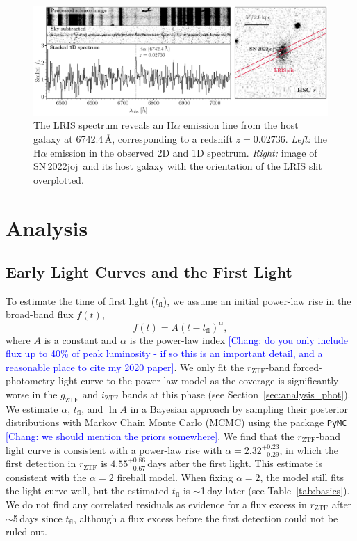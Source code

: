 \documentclass[twocolumn]{aastex631}
\newcommand{\sn}{SN\,2022joj}
\newcommand{\chang}[1]{\textcolor{blue}{[Chang: #1]}}
\begin{document}
\begin{CJK*}{UTF8}{gbsn}


\begin{figure}
    \centering
    \includegraphics[width=\linewidth]{host_spec.pdf}
    \caption{The LRIS spectrum reveals an H$\alpha$ emission line from the host galaxy at 6742.4\,\AA, corresponding to a redshift $z=0.02736$. \textit{Left:} the H$\alpha$ emission in the observed 2D and 1D spectrum. %
    \textit{Right:} image of \sn\ and its host galaxy with the orientation of the LRIS slit overplotted.    
    }
    \label{fig:host_spec}
\end{figure}

\section{Analysis} \label{sec:analysis}
\subsection{Early Light Curves and the First Light}
To estimate the time of first light ($t_\mathrm{fl}$), we assume an initial power-law rise in the broad-band flux $f(t)$,
$$
f(t) = A (t-t_\mathrm{fl})^\alpha,
$$
where $A$ is a constant and $\alpha$ is the power-law index \chang{do you only include flux up to 40\% of peak luminosity - if so this is an important detail, and a reasonable place to cite my 2020 paper}. We only fit the $r_\mathrm{ZTF}$-band forced-photometry light curve to the power-law model as the coverage is significantly worse in the $g_\mathrm{ZTF}$ and $i_\mathrm{ZTF}$ bands at this phase (see Section~\ref{sec:analysis_phot}). We estimate $\alpha$, $t_\mathrm{fl}$, and $\ln A$ in a Bayesian approach by sampling their posterior distributions with Markov Chain Monte Carlo (MCMC) using the package \texttt{PyMC} \citep{pymc_2016} \chang{we should mention the priors somewhere}. We find that the $r_\mathrm{ZTF}$-band light curve is consistent with a power-law rise with $\alpha=2.32^{+0.23}_{-0.29}$, in which the first detection in $r_\mathrm{ZTF}$ is $4.55^{+0.86}_{-0.67}$\,days after the first light. This estimate is consistent with the $\alpha=2$ fireball model. When fixing $\alpha=2$, the model still fits the light curve well, but the estimated $t_\mathrm{fl}$ is $\sim$1\,day later (see Table~\ref{tab:basics}). We do not find any correlated residuals as evidence for a flux excess in $r_\mathrm{ZTF}$ after $\sim$5\,days since $t_\mathrm{fl}$, although a flux excess before the first detection could not be ruled out.



\end{CJK*}
\end{document}
